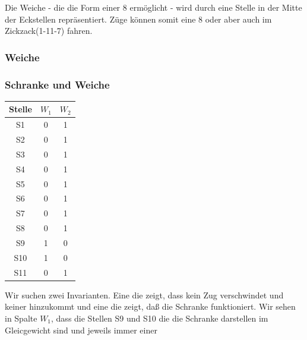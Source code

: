 \documentclass[10pt]{scrartcl}
\begin{document}
Die Weiche - die die Form einer 8 ermöglicht - wird durch eine Stelle in der Mitte der Eckstellen repräsentiert. Züge können somit eine 8 oder aber auch \glqq{}im Zickzack\grqq (1-11-7) fahren.



		
		
		\subsubsection{Weiche}
		
		\subsubsection{Schranke und Weiche}
		\begin{tabular}{|c|c|c|}
\hline Stelle  & $W_1$ & $W_2$ \\ 
\hline S1 & 0 & 1 \\ 
\hline S2 & 0 & 1 \\ 
\hline S3 & 0 & 1 \\ 
\hline S4 & 0 & 1 \\ 
\hline S5 & 0 & 1 \\ 
\hline S6 & 0 & 1 \\ 
\hline S7 & 0 & 1 \\ 
\hline S8 & 0 & 1 \\ 
\hline S9 & 1 & 0 \\ 
\hline S10 & 1  & 0 \\ 
\hline S11 & 0 & 1 \\
\hline 
\end{tabular} 
Wir suchen zwei Invarianten. Eine die zeigt, dass kein Zug verschwindet und keiner hinzukommt und eine die zeigt, daß die Schranke funktioniert. Wir sehen in Spalte $W_1$, dass die Stellen S9 und S10 die die Schranke darstellen im Gleicgewicht sind und jeweils immer einer 


		
		
\end{document}
